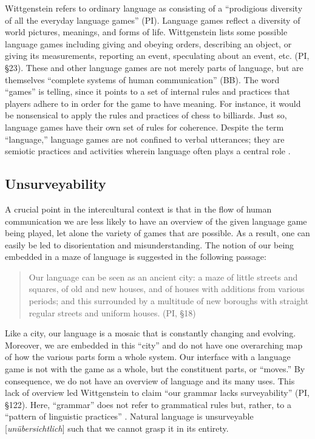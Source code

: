 Wittgenstein refers to ordinary language as consisting of a ``prodigious diversity of all the everyday language games'' (PI). Language games reflect a diversity of world pictures, meanings, and forms of life. Wittgenstein lists some possible language games including giving and obeying orders, describing an object, or giving its measurements, reporting an event, speculating about an event, etc. (PI, \S   23). These and other language games are not merely parts of language, but are themselves ``complete systems of human communication'' (BB). The word ``games'' is telling, since it points to a set of internal rules and practices that players adhere to in order for the game to have meaning. For instance, it would be nonsensical to apply the rules and practices of chess to billiards. Just so, language games have their own set of rules for coherence. Despite the term ``language,'' language games are not confined to verbal utterances; they are semiotic practices and activities wherein language often plays a central role \citep{Xanthos2019}.

\subsection{Unsurveyability}

A crucial point in the intercultural context is that in the flow of human communication we are less likely to have an overview of the given language game being played, let alone the variety of games that are possible. As a result, one can easily be led to disorientation and misunderstanding. The notion of our being embedded in a maze of language is suggested in the following passage:   

\begin{quote}
Our language can be seen as an ancient city: a maze of little streets and squares, of old and new houses, and of houses with additions from various periods; and this surrounded by a multitude of new boroughs with straight regular streets and uniform
houses. (PI, \S   18)
\end{quote}

Like a city, our language is a mosaic that is constantly changing and evolving. Moreover, we are embedded in this ``city'' and do not have one overarching map of how the various parts form a whole system. Our interface with a language game is not with the game as a whole, but the constituent parts, or ``moves.'' By consequence, we do not have an overview of language and its many uses. This lack of overview led Wittgenstein to claim ``our grammar lacks surveyability'' (PI, \S 122). Here, ``grammar'' does not refer to grammatical rules but, rather, to a ``pattern of linguistic practices'' \cite[90]{Sluga2011a}. Natural language is unsurveyable [\textit{un{\"u}bersichtlich}] such that we cannot grasp it in its entirety. 

